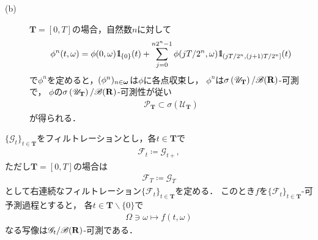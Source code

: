 \begin{sketch}
\begin{description}
\begin{description}
					\item[(b)] $\mathbf{T} = [0,T]$の場合，自然数$n$に対して
						\begin{align}
							\phi^n(t,\omega)
							= \phi(0,\omega)\mbox{1}\hspace{-0.25em}\mbox{l}_{\{0\}}(t) + 
							\sum_{j=0}^{n2^n-1}\phi(jT/2^n,\omega) \mbox{1}\hspace{-0.25em}\mbox{l}_{(jT/2^n,(j+1)T/2^n]}(t)
						\end{align}
						で$\phi^n$を定めると，$(\phi^n)_{n\in{\boldsymbol \omega}}$は$\phi$に各点収束し，
						$\phi^n$は$\sigma\left(\mathscr{U}_{\mathbf{T}}\right)/\mathscr{B}(\mathbf{R})$-可測で，
						$\phi$の$\sigma\left(\mathscr{U}_{\mathbf{T}}\right)/\mathscr{B}(\mathbf{R})$-可測性が従い
						\begin{align}
							\mathscr{P}_{\mathbf{T}} \subset \sigma\left(\mathscr{U}_{\mathbf{T}}\right)
						\end{align}
						が得られる．\QED
				\end{description}
		\end{description}
	\end{sketch}
	
	\begin{screen}
		\begin{thm}[右連続化したフィルトレーションに関する可予測過程は元のフィルトレーションに適合する]
		\label{thm:predictable_process_adapted_to_right_continuous_filtration}
			$\{\mathscr{G}_t\}_{t \in \mathbf{T}}$をフィルトレーションとし，各$t \in \mathbf{T}$で
			\begin{align}
				\mathscr{F}_t \coloneqq \mathscr{G}_{t+},
			\end{align}
			ただし$\mathbf{T} = [0,T]$の場合は
			\begin{align}
				\mathscr{F}_T \coloneqq \mathscr{G}_{T}
			\end{align}
			として右連続なフィルトレーション$\{\mathscr{F}_t\}_{t \in \mathbf{T}}$を定める．
			このとき$f$を$\{\mathscr{F}_t\}_{t \in \mathbf{T}}$-可予測過程とすると，
			各$t \in \mathbf{T} \backslash \{0\}$で
			\begin{align}
				\Omega \ni \omega \longmapsto f(t,\omega)
			\end{align}
			なる写像は$\mathscr{G}_t/\mathscr{B}(\mathbf{R})$-可測である．
		\end{thm}
	\end{screen}
	
